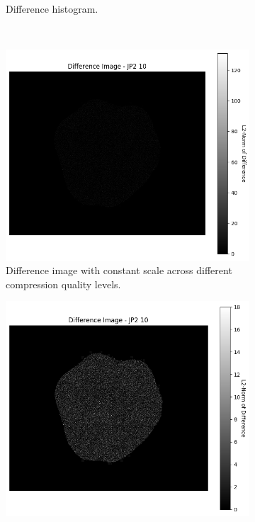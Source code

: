 \begin{figure}[htb]
\begin{subfigure}[b]{0.48\textwidth}
        \caption{Difference histogram.}
        \label{fig:img_quality_comp_jp2_10_histo}
    \end{subfigure}
    \\
    \begin{subfigure}[b]{0.48\textwidth}
        \centering
        \includegraphics[width=\textwidth]{doc/thesis/0_figures/compare_quality/set1/jp2_10_diff_heatmap.png}
        \caption{Difference image with constant scale across different compression quality levels.}
        \label{fig:img_quality_comp_jp2_10_diff}
    \end{subfigure}
    \begin{subfigure}[b]{0.48\textwidth}
        \centering
        \includegraphics[width=\textwidth]{doc/thesis/0_figures/compare_quality/set1/jp2_10_diff_heatmap_rel.png}

\end{subfigure}
\end{figure}
